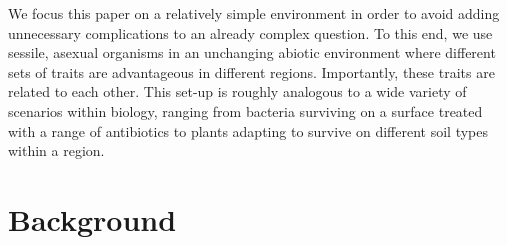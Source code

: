 We focus this paper on a relatively simple environment in order to avoid adding unnecessary complications to an already complex question. To this end, we use sessile, asexual  organisms in an unchanging abiotic environment where different sets of traits are advantageous in different regions. Importantly, these traits are related to each other. This set-up is roughly analogous to a wide variety of scenarios within biology, ranging from bacteria surviving on a surface treated with a range of antibiotics to plants adapting to survive on different soil types within a region. 
% 
% 
% 
% 
% 


\section{Background}

